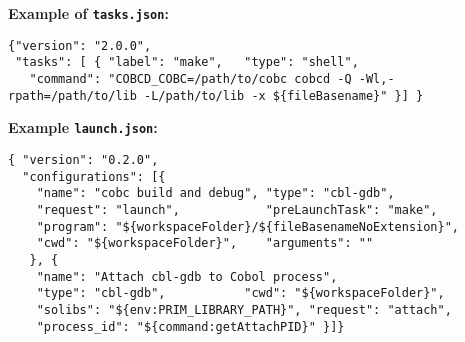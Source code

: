 \documentclass[10pt,landscape]{article}
\begin{document}
\begin{multicols}{3}
{\bf Example of \verb+tasks.json+:}\vspace{-3mm}
\begin{verbatim}
{"version": "2.0.0",
 "tasks": [ { "label": "make",   "type": "shell",
   "command": "COBCD_COBC=/path/to/cobc cobcd -Q -Wl,-rpath=/path/to/lib -L/path/to/lib -x ${fileBasename}" }] }
\end{verbatim}\vspace{-2mm}
{\bf Example \verb+launch.json+:}\vspace{-3mm}
\begin{verbatim}
{ "version": "0.2.0",
  "configurations": [{
    "name": "cobc build and debug", "type": "cbl-gdb",
    "request": "launch",            "preLaunchTask": "make",
    "program": "${workspaceFolder}/${fileBasenameNoExtension}",
    "cwd": "${workspaceFolder}",    "arguments": ""
   }, {
    "name": "Attach cbl-gdb to Cobol process",
    "type": "cbl-gdb",           "cwd": "${workspaceFolder}",
    "solibs": "${env:PRIM_LIBRARY_PATH}", "request": "attach",
    "process_id": "${command:getAttachPID}" }]}
\end{verbatim}

\end{multicols}
\end{document}
